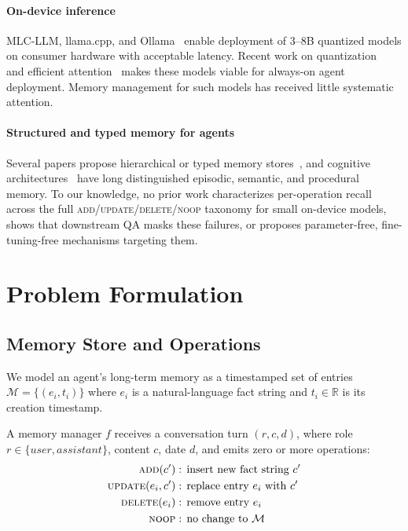 \documentclass[10pt, twocolumn]{article}
\begin{document}
\paragraph{On-device inference}
MLC-LLM, llama.cpp, and Ollama~\cite{ollama2024} enable deployment of
3--8B quantized models on consumer hardware with acceptable latency.
Recent work on quantization~\cite{dettmers2022gptq} and efficient
attention~\cite{dao2022flashattention} makes these models viable for
always-on agent deployment.
Memory management for such models has received little systematic attention.

\paragraph{Structured and typed memory for agents}
Several papers propose hierarchical or typed memory
stores~\cite{zhong2024memorybank,zhang2024survey}, and cognitive
architectures~\cite{anderson1983architecture} have long distinguished
episodic, semantic, and procedural memory.
To our knowledge, no prior work characterizes per-operation recall across the
full \textsc{add}/\textsc{update}/\textsc{delete}/\textsc{noop} taxonomy for
small on-device models, shows that downstream QA masks these failures, or
proposes parameter-free, fine-tuning-free mechanisms targeting them.

\section{Problem Formulation}
\label{sec:problem}

\subsection{Memory Store and Operations}

We model an agent's long-term memory as a timestamped set of entries
$\mathcal{M} = \{(e_i, t_i)\}$ where $e_i$ is a natural-language fact string
and $t_i \in \mathbb{R}$ is its creation timestamp.

A memory manager $f$ receives a conversation turn $(r, c, d)$, where
role $r \in \{\textit{user}, \textit{assistant}\}$, content $c$, date $d$,
and emits zero or more operations:
\begin{align*}
  \textsc{add}(c') &\;\text{: insert new fact string } c'\\
  \textsc{update}(e_i, c') &\;\text{: replace entry } e_i \text{ with } c'\\
  \textsc{delete}(e_i) &\;\text{: remove entry } e_i\\
  \textsc{noop} &\;\text{: no change to } \mathcal{M}
\end{align*}
\end{document}
